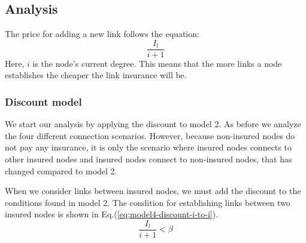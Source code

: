 \subsection{Analysis}
The price for adding a new link follows the equation:
\begin{equation}
\frac{I_{l}}{i+1}
\label{eq:discount0}
\end{equation}
Here, $i$ is the node's current degree. This means that the more links a node establishes the cheaper the link insurance will be. 
\subsubsection{Discount model}
We start our analysis by applying the discount to model 2. As before we analyze the four different connection scenarios. However, because non-insured nodes do not pay any insurance, it is only the scenario where insured nodes connects to other insured nodes and insured nodes connect to non-insured nodes, that has changed compared to model 2.

When we consider links between insured nodes, we must add the discount to the conditions found in model 2. The condition for establishing links between two insured nodes is shown in Eq.(\ref{eq:model4-discount-i-to-i}).
\begin{equation}
\frac{I_{l}}{i+1}<\beta
\label{eq:model4-discount-i-to-i}
\end{equation}

